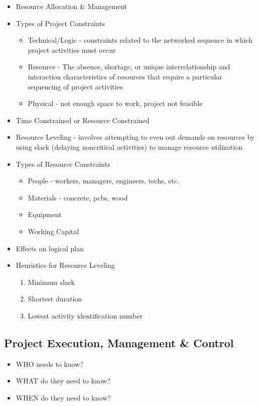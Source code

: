 \documentclass[8pt, letter]{extarticle}
\begin{document}
\begin{multicols}{2}
    \begin{itemize}
        \item Resource Allocation \& Management
        \item Types of Project Constraints
            \begin{itemize}
                \item Technical/Logic - constraints related to the networked sequence in which project activities must occur
                \item Resource - The absence, shortage, or unique interrelationship and interaction characteristics of resources that require a particular sequencing of project activities
                \item Physical - not enough space to work, project not feasible
            \end{itemize}
        \item Time Constrained or Resource Constrained
        \item Resource Leveling - involves attempting to even out demands on resources by using slack (delaying noncritical activities) to manage resource utilization
        \item Types of Resource Constraints
            \begin{itemize}
                \item People - workers, managers, engineers, techs, etc.
                \item Materials - concrete, pcbs, wood
                \item Equipment
                \item Working Capital
            \end{itemize}
        \item Effects on logical plan
        \item Heuristics for Resource Leveling
            \begin{enumerate}
                \item Minimum slack
                \item Shortest duration
                \item Lowest activity identification number
            \end{enumerate}
    \end{itemize}

    \subsection{Project Execution, Management \& Control}
    \begin{itemize}
        \item WHO needs to know?
        \item WHAT do they need to know?
        \item WHEN do they need to know?
    \end{itemize}


\end{multicols}
\end{document}
